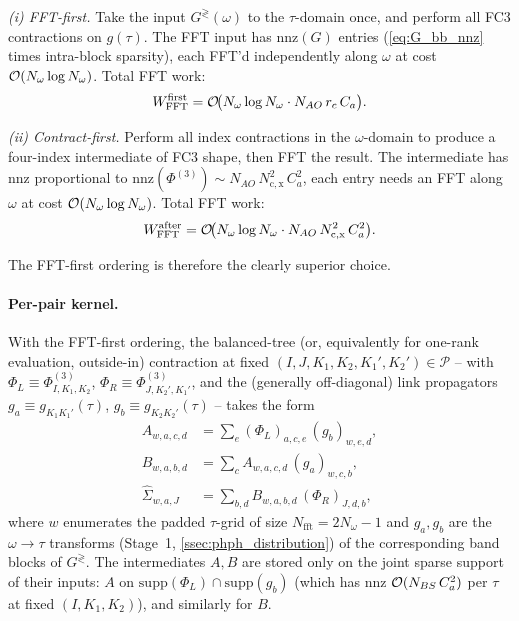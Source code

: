 \emph{(i) FFT-first.} Take the input $G^{\gtrless}(\omega)$ to the
$\tau$-domain once, and perform all FC3 contractions on $g(\tau)$.
The FFT input has $\mathrm{nnz}(G)$ entries (\cref{eq:G_bb_nnz}
times intra-block sparsity), each FFT'd independently along $\omega$
at cost $\mathcal{O}(N_\omega\log N_\omega)$. Total FFT work:
\begin{equation}\label{eq:fft_cost_first}
  W_\mathrm{FFT}^\mathrm{first}
  = \mathcal{O}\!\bigl(N_\omega\log N_\omega \cdot
               N_{AO}\,r_c\,C_a\bigr).
\end{equation}

\emph{(ii) Contract-first.} Perform all index contractions in the
$\omega$-domain to produce a four-index intermediate of FC3 shape,
then FFT the result. The intermediate has nnz proportional to
$\mathrm{nnz}(\Phi^{(3)})\sim N_{AO}\,N_\mathrm{c,x}^{2}\,C_a^{2}$,
each entry needs an FFT along $\omega$ at cost
$\mathcal{O}(N_\omega\log N_\omega)$. Total FFT work:
\begin{equation}\label{eq:fft_cost_after}
  W_\mathrm{FFT}^\mathrm{after}
  = \mathcal{O}\!\bigl(N_\omega\log N_\omega \cdot
               N_{AO}\,N_\mathrm{c,x}^{2}\,C_a^{2}\bigr).
\end{equation}

The FFT-first ordering is therefore the
clearly superior choice.

\paragraph{Per-pair kernel.} With the FFT-first ordering, the
balanced-tree (or, equivalently for one-rank evaluation, outside-in)
contraction at fixed $(I,J,K_1,K_2,K_1',K_2')\in\mathcal{P}$ -- with
$\Phi_L\equiv\Phi^{(3)}_{I,K_1,K_2}$, $\Phi_R\equiv\Phi^{(3)}_{J,K_2',K_1'}$,
and the (generally off-diagonal) link propagators
$g_a\equiv g_{K_1K_1'}(\tau)$, $g_b\equiv g_{K_2K_2'}(\tau)$ -- takes the
form
\begin{align}
  A_{w,a,c,d}
    &= \sum_{e}(\Phi_L)_{a,c,e}\,(g_b)_{w,e,d},
    \label{eq:phph_step_A}\\
  B_{w,a,b,d}
    &= \sum_{c}A_{w,a,c,d}\,(g_a)_{w,c,b},
    \label{eq:phph_step_B}\\
  \hat\Sigma_{w,a,J}
    &= \sum_{b,d}B_{w,a,b,d}\,(\Phi_R)_{J,d,b},
    \label{eq:phph_step_S}
\end{align}
where $w$ enumerates the padded $\tau$-grid of size
$N_\mathrm{fft}=2N_\omega-1$ and $g_a,g_b$ are the
$\omega\to\tau$ transforms (Stage~1,
\cref{ssec:phph_distribution}) of the corresponding band blocks of
$G^{\gtrless}$. The intermediates $A,B$ are stored only on the joint
sparse support of their inputs: $A$ on
$\mathrm{supp}(\Phi_L)\cap\mathrm{supp}(g_b)$ (which has nnz
$\mathcal{O}(N_{BS}\,C_a^{2})$ per $\tau$ at fixed $(I,K_1,K_2)$), and
similarly for $B$.

